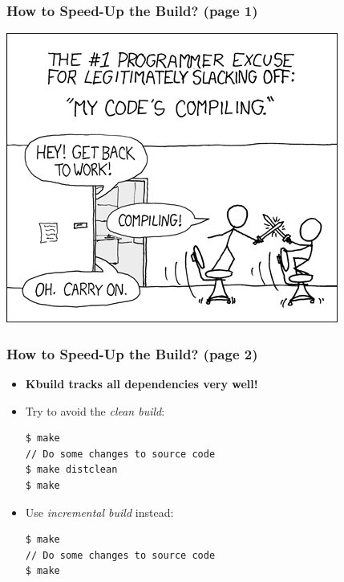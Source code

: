 \documentclass[aspectratio=169]{beamer}
\begin{document}
\begin{frame}
  \frametitle{How to Speed-Up the Build? (page 1)}
  \begin{center}
    \includegraphics[scale=0.45]{images/compiling.png}
  \end{center}
\end{frame}

\begin{frame}[fragile]
  \frametitle{How to Speed-Up the Build? (page 2)}
  \begin{itemize}
    \item \alert{\textbf{Kbuild tracks all dependencies very well!}}
    \item Try to avoid the \textit{clean build}:
    \begin{verbatim}
$ make
// Do some changes to source code
$ make distclean
$ make
    \end{verbatim}
    \item Use \textit{incremental build} instead:
    \begin{verbatim}
$ make
// Do some changes to source code
$ make
    \end{verbatim}
  \end{itemize}
  \vspace*{-3mm}
\end{frame}
\end{document}
